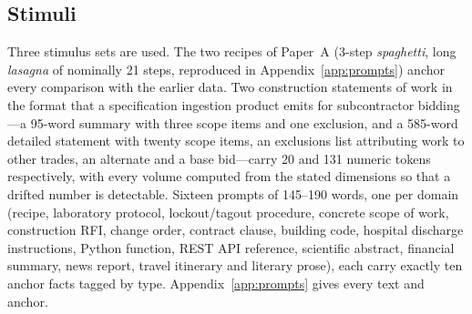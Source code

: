 \documentclass[11pt]{article}
\begin{document}
\begin{table}[htbp]
\centering
\caption{Model inventory. All Qwen builds are the instruct checkpoints
  \citep{qwen2026qwen36_35b,qwen2026qwen36_27b,qwen2026qwen38_27b,
  qwen2026qwen38flashnext}. GGUF tier is Unsloth UD-Q4\_K\_XL. Hardware is
  given in Appendix~\ref{app:compute}.}
\label{tab:inventory}
\small
{}
\end{table}

\subsection{Stimuli}
\label{sec:stimuli}

Three stimulus sets are used. The two recipes of Paper~A (3-step
\emph{spaghetti}, long \emph{lasagna} of nominally 21 steps, reproduced in
Appendix~\ref{app:prompts}) anchor every comparison with the earlier data.
Two construction statements of work in the format that a specification
ingestion product emits for subcontractor bidding---a 95-word summary with
three scope items and one exclusion, and a 585-word detailed statement with
twenty scope items, an exclusions list attributing work to other trades, an
alternate and a base bid---carry 20 and 131 numeric tokens respectively,
with every volume computed from the stated dimensions so that a drifted
number is detectable. Sixteen prompts of 145--190 words, one per domain
(recipe, laboratory protocol, lockout/tagout procedure, concrete scope of
work, construction RFI, change order, contract clause, building code,
hospital discharge instructions, Python function, REST API reference,
scientific abstract, financial summary, news report, travel itinerary and
literary prose), each carry exactly ten anchor facts tagged by type.
Appendix~\ref{app:prompts} gives every text and anchor.
\end{document}
